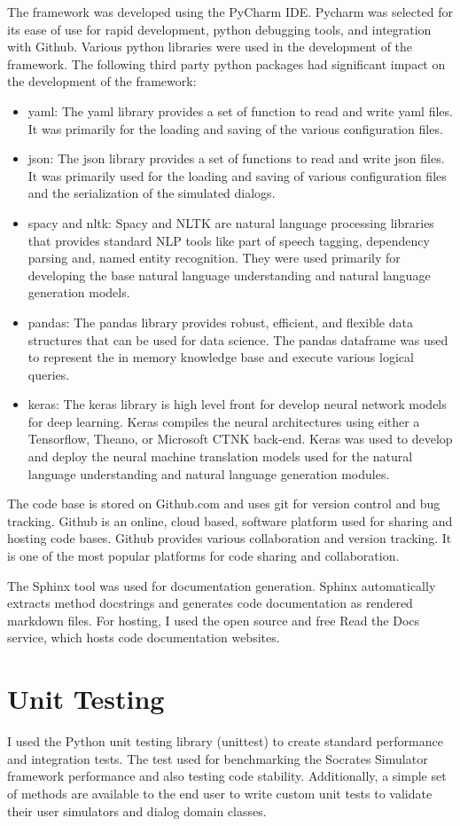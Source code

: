 The framework was developed using the PyCharm IDE. Pycharm was selected for its ease of use for rapid development, python debugging tools, and integration with Github. Various python libraries were used in the development of the framework. The following third party python packages had significant impact on the development of the framework:
\begin{itemize}
	\item yaml: The yaml library provides a set of function to read and write yaml files. It was primarily for the loading and saving of the various configuration files. 
	\item json: The json library provides a set of functions to read and write json files. It was primarily used for the loading and saving of various configuration files and the serialization of the simulated dialogs. 
	\item spacy and nltk: Spacy and NLTK are natural language processing libraries that provides standard NLP tools like part of speech tagging, dependency parsing and, named entity recognition. They were used primarily for developing the base natural language understanding and natural language generation models. 
	\item pandas: The pandas library provides robust, efficient, and flexible data structures that can be used for data science. The pandas dataframe was used to represent the in memory knowledge base and execute various logical queries.
	\item keras: The keras library is high level front for develop neural network models for deep learning. Keras compiles the neural architectures using either a Tensorflow, Theano, or Microsoft CTNK back-end. Keras was used to develop and deploy the neural machine translation models used for the natural language understanding and natural language generation modules.
\end{itemize}

The code base is stored on Github.com and uses git for version control and bug tracking. Github is an online, cloud based, software platform used for sharing and hosting code bases. Github provides various collaboration and version tracking. It is one of the most popular platforms for code sharing and collaboration. 

The Sphinx tool was used for documentation generation. Sphinx automatically extracts method docstrings and generates code documentation as rendered markdown files. For hosting, I used the open source and free Read the Docs service, which hosts code documentation websites.  

\section{Unit Testing}

I used the Python unit testing library (unittest) to create standard performance and integration tests. The test used for benchmarking the Socrates Simulator framework performance and also testing code stability. Additionally, a simple set of methods are available to the end user to write custom unit tests to validate their user simulators and dialog domain classes. 



